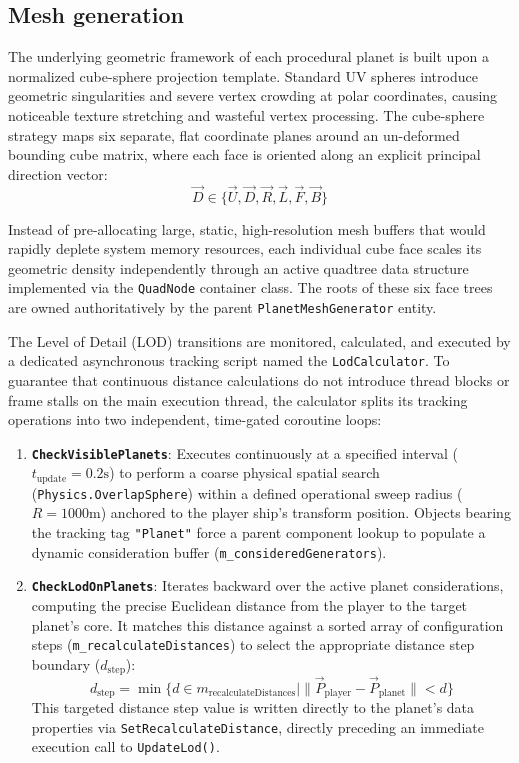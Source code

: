 \documentclass[12pt]{report}
\begin{document}
\subsection{Mesh generation}

The underlying geometric framework of each procedural planet is built upon a normalized cube-sphere projection template. Standard UV spheres introduce geometric singularities and severe vertex crowding at polar coordinates, causing noticeable texture stretching and wasteful vertex processing. The cube-sphere strategy maps six separate, flat coordinate planes around an un-deformed bounding cube matrix, where each face is oriented along an explicit principal direction vector:
\begin{equation}
\vec{D} \in \{\vec{U}, \vec{D}, \vec{R}, \vec{L}, \vec{F}, \vec{B}\}
\end{equation}

Instead of pre-allocating large, static, high-resolution mesh buffers that would rapidly deplete system memory resources, each individual cube face scales its geometric density independently through an active quadtree data structure implemented via the \texttt{QuadNode} container class. The roots of these six face trees are owned authoritatively by the parent \texttt{PlanetMeshGenerator} entity.

The Level of Detail (LOD) transitions are monitored, calculated, and executed by a dedicated asynchronous tracking script named the \texttt{LodCalculator}. To guarantee that continuous distance calculations do not introduce thread blocks or frame stalls on the main execution thread, the calculator splits its tracking operations into two independent, time-gated coroutine loops:
\begin{enumerate}
    \item \textbf{\texttt{CheckVisiblePlanets}}: Executes continuously at a specified interval ($t_{\text{update}} = 0.2\text{s}$) to perform a coarse physical spatial search (\texttt{Physics.OverlapSphere}) within a defined operational sweep radius ($R = 1000\text{m}$) anchored to the player ship's transform position. Objects bearing the tracking tag \texttt{"Planet"} force a parent component lookup to populate a dynamic consideration buffer (\texttt{m\_consideredGenerators}).
    \item \textbf{\texttt{CheckLodOnPlanets}}: Iterates backward over the active planet considerations, computing the precise Euclidean distance from the player to the target planet's core. It matches this distance against a sorted array of configuration steps (\texttt{m\_recalculateDistances}) to select the appropriate distance step boundary ($d_{\text{step}}$):
    \begin{equation}
    d_{\text{step}} = \min \{ d \in m_{\text{recalculateDistances}} \mid \|\vec{P}_{\text{player}} - \vec{P}_{\text{planet}}\| < d \}
    \end{equation}
    This targeted distance step value is written directly to the planet's data properties via \texttt{SetRecalculateDistance}, directly preceding an immediate execution call to \texttt{UpdateLod()}.
\end{enumerate}
\end{document}
